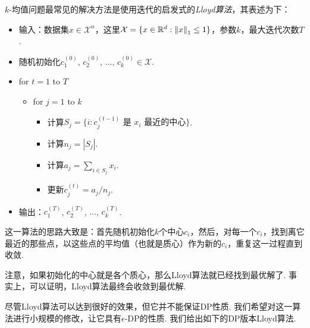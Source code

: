 $k$-均值问题最常见的解决方法是使用迭代的启发式的\textit{Lloyd算法}，其表述为下：
\begin{itemize}
    \item 输入：数据集$x \in \mathcal X^n$，这里$\mathcal X = \{x \in \mathbb{R}^d : \left\|x\right\|_1 \leq 1 \}$，参数$k$，最大迭代次数$T$.
    \item 随机初始化$c_1^{(0)}$, $c_2^{(0)}$, $\dots$, $c_k^{(0)} \in \mathcal X$.
    \item for $t=1$ to $T$
    \begin{itemize}
        \item for $j=1$ to $k$
        \begin{itemize}
            \item 计算$S_j = \{i : c_{j}^{(t-1)} \text{ 是\ } x_i \text{ 最近的中心}\}$.
            \item 计算$n_j = |S_j|$.
            \item 计算$a_j = \sum_{i\in S_j} x_i$.
            \item 更新$c_j^{(t)} = a_j/n_j$.
        \end{itemize}
    \end{itemize}
    \item 输出：$c_1^{(T)}$, $c_2^{(T)}$, $\dots$, $c_k^{(T)}$.
\end{itemize}

这一算法的思路大致是：首先随机初始化$k$个中心$c_i$，然后，对每一个$c_i$，找到离它最近的那些点，以这些点的平均值（也就是质心）作为新的$c_i$，重复这一过程直到收敛.

注意，如果初始化的中心就是各个质心，那么Lloyd算法就已经找到最优解了. 事实上，可以证明，Lloyd算法最终会收敛到最优解. 

尽管Lloyd算法可以达到很好的效果，但它并不能保证DP性质. 我们希望对这一算法进行小规模的修改，让它具有$\epsilon$-DP的性质. 我们给出如下的DP版本Lloyd算法.

